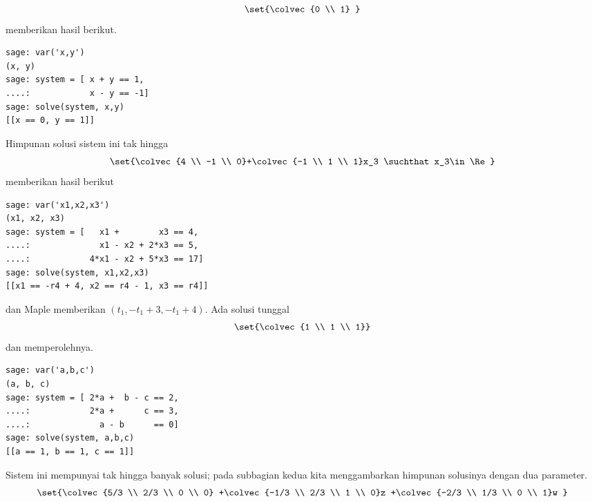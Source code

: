 \begin{exercises}
\begin{answer}
\begin{exparts}
\begin{equation*}
             \set{\colvec{0 \\ 1} }
          \end{equation*}
          \Sage{} memberikan hasil berikut.
\begin{lstlisting}
sage: var('x,y')
(x, y)
sage: system = [ x + y == 1,
....:            x - y == -1]
sage: solve(system, x,y)
[[x == 0, y == 1]]            
\end{lstlisting}
        \partsitem Himpunan solusi sistem ini tak hingga
          \begin{equation*}
            \set{\colvec{4 \\ -1 \\ 0}+\colvec{-1 \\ 1 \\ 1}x_3
                             \suchthat x_3\in\Re}
          \end{equation*}
          \Sage{} memberikan hasil berikut
\begin{lstlisting}
sage: var('x1,x2,x3')
(x1, x2, x3)
sage: system = [   x1 +        x3 == 4,
....:              x1 - x2 + 2*x3 == 5,
....:            4*x1 - x2 + 5*x3 == 17]
sage: solve(system, x1,x2,x3)
[[x1 == -r4 + 4, x2 == r4 - 1, x3 == r4]]            
\end{lstlisting}
          dan Maple memberikan $(t_1,-t_1+3,-t_1+4)$.
        \partsitem Ada solusi tunggal
           \begin{equation*}
             \set{\colvec{1 \\ 1 \\ 1}}
           \end{equation*}
           dan \Sage{} memperolehnya.
\begin{lstlisting}
sage: var('a,b,c')
(a, b, c)
sage: system = [ 2*a +  b - c == 2,
....:            2*a +      c == 3,
....:              a - b      == 0]
sage: solve(system, a,b,c)
[[a == 1, b == 1, c == 1]]             
\end{lstlisting}
        \partsitem Sistem ini mempunyai tak hingga banyak solusi; pada 
           subbagian kedua kita menggambarkan himpunan solusinya dengan
           dua parameter.
           \begin{equation*}
             \set{\colvec{5/3 \\ 2/3 \\ 0 \\ 0}
                  +\colvec{-1/3 \\ 2/3 \\ 1 \\ 0}z
                  +\colvec{-2/3 \\ 1/3 \\ 0 \\ 1}w
}
\end{equation*}
\end{exparts}
\end{answer}
\end{exercises}
